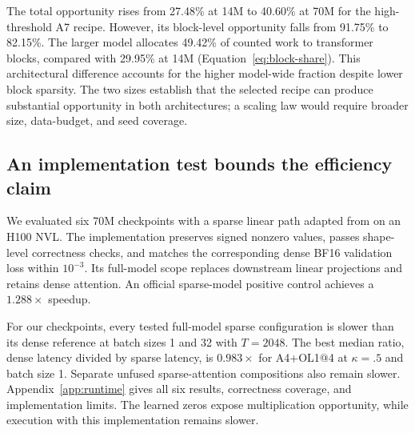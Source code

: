The total opportunity rises from 27.48\% at 14M to 40.60\% at 70M for the
high-threshold A7 recipe. However, its block-level opportunity falls from
91.75\% to 82.15\%. The larger model allocates 49.42\% of counted work to
transformer blocks, compared with 29.95\% at 14M
(Equation~\ref{eq:block-share}). This architectural difference accounts for
the higher model-wide fraction despite lower block sparsity.
The two sizes establish that the selected recipe can produce substantial
opportunity in both architectures; a scaling law would require broader
size, data-budget, and seed coverage.

\subsection{An implementation test bounds the efficiency claim}
\label{sec:runtime-results}
We evaluated six 70M checkpoints with a sparse linear path adapted from
\citet{cetin2026sparser} on an H100 NVL. The implementation preserves signed
nonzero values, passes shape-level correctness checks, and matches the
corresponding dense BF16 validation loss within $10^{-3}$. Its full-model
scope replaces downstream linear projections and retains dense attention.
An official sparse-model positive control achieves a $1.288\times$ speedup.

For our checkpoints, every tested full-model sparse configuration is slower
than its dense reference at batch sizes 1 and 32 with $T=2048$.
The best median ratio, dense latency divided by sparse latency, is
$0.983\times$ for A4+OL1@4 at $\kappa=.5$ and batch size 1.
Separate unfused sparse-attention compositions also remain slower.
Appendix~\ref{app:runtime} gives all six results, correctness coverage,
and implementation limits. The learned zeros expose multiplication
opportunity, while execution with this implementation remains slower.
